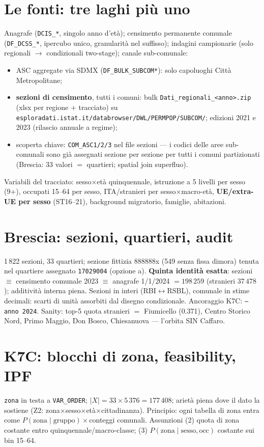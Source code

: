 \documentclass[11pt,a4paper]{article}
\newcommand{\code}[1]{\texttt{#1}}
\newcommand{\flow}[1]{\texttt{\small #1}}
\begin{document}
\section{Le fonti: tre laghi pi\`u uno}
\label{sec:laghi}
Anagrafe (\flow{DCIS\_*}, singolo anno d'et\`a); censimento permanente
comunale (\flow{DF\_DCSS\_*}, ipercubo unico, granularit\`a nel suffisso);
indagini campionarie (solo regionali $\to$ condizionali two-stage); canale
sub-comunale:
\begin{itemize}[leftmargin=*,itemsep=1pt]
  \item ASC aggregate via SDMX (\flow{DF\_BULK\_SUBCOM*}): solo capoluoghi
  Citt\`a Metropolitane;
  \item \textbf{sezioni di censimento}, tutti i comuni: bulk
  \code{Dati\_regionali\_<anno>.zip} (xlsx per regione + tracciato) su
  \code{esploradati.istat.it/databrowser/DWL/PERMPOP/SUBCOM/}; edizioni 2021
  e 2023 (rilascio annuale a regime);
  \item scoperta chiave: \code{COM\_ASC1/2/3} nel file sezioni --- i codici
  delle aree sub-comunali sono gi\`a assegnati sezione per sezione per tutti
  i comuni partizionati (Brescia: 33 valori $=$ quartieri; spatial join
  superfluo).
\end{itemize}
Variabili del tracciato: sesso$\times$et\`a quinquennale, istruzione a 5
livelli per sesso (9+), occupati 15--64 per sesso, ITA/stranieri per
sesso$\times$macro-et\`a, \textbf{UE/extra-UE per sesso} (ST16--21),
background migratorio, famiglie, abitazioni.

\section{Brescia: sezioni, quartieri, audit}
1\,822 sezioni, 33 quartieri; sezione fittizia 888888x (549 senza fissa
dimora) tenuta nel quartiere assegnato \code{17029004} (opzione a).
\textbf{Quinta identit\`a esatta}: sezioni $\equiv$ censimento comunale 2023
$\equiv$ anagrafe 1/1/2024 $= 198\,259$ (stranieri $37\,478$); additivit\`a
interna piena. Sezioni in interi (RBI$\leftrightarrow$RSBL), comunale in
stime decimali: scarti di unit\`a assorbiti dal disegno condizionale.
Ancoraggio K7C: \code{--anno 2024}. Sanity: top-5 quota stranieri $=$
Fiumicello (0.371), Centro Storico Nord, Primo Maggio, Don Bosco,
Chiesanuova --- l'orbita SIN Caffaro.

\section{K7C: blocchi di zona, feasibility, IPF}
\label{sec:k7c}
\code{zona} in testa a \code{VAR\_ORDER}; $|X| = 33\times5\,376 = 177\,408$;
ariet\`a piena dove il dato la sostiene (Z2:
zona$\times$sesso$\times$et\`a$\times$cittadinanza). Principio: ogni tabella
di zona entra come $P(\text{zona}\mid\text{gruppo})\times$conteggi comunali.
Assunzioni (2) quota di zona costante entro quinquennale/macro-classe;
(3) $P(\text{zona}\mid\text{sesso},\text{occ})$ costante sui bin 15--64.
\end{document}
